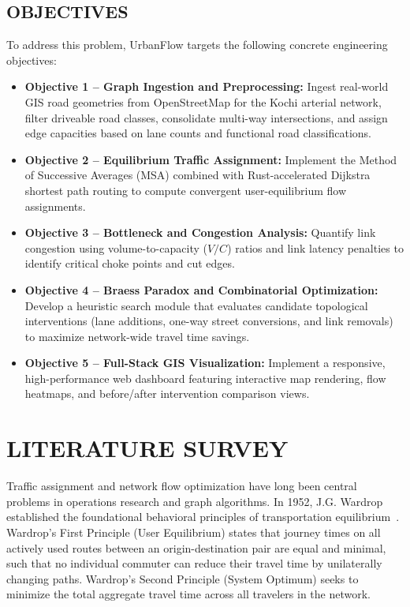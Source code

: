 \documentclass[12pt,a4paper]{report}
\begin{document}
\section{OBJECTIVES}
To address this problem, UrbanFlow targets the following concrete engineering objectives:
\begin{itemize}
  \item \textbf{Objective 1 -- Graph Ingestion and Preprocessing:} Ingest real-world GIS road geometries from OpenStreetMap for the Kochi arterial network, filter driveable road classes, consolidate multi-way intersections, and assign edge capacities based on lane counts and functional road classifications.
  \item \textbf{Objective 2 -- Equilibrium Traffic Assignment:} Implement the Method of Successive Averages (MSA) combined with Rust-accelerated Dijkstra shortest path routing to compute convergent user-equilibrium flow assignments.
  \item \textbf{Objective 3 -- Bottleneck and Congestion Analysis:} Quantify link congestion using volume-to-capacity ($V/C$) ratios and link latency penalties to identify critical choke points and cut edges.
  \item \textbf{Objective 4 -- Braess Paradox and Combinatorial Optimization:} Develop a heuristic search module that evaluates candidate topological interventions (lane additions, one-way street conversions, and link removals) to maximize network-wide travel time savings.
  \item \textbf{Objective 5 -- Full-Stack GIS Visualization:} Implement a responsive, high-performance web dashboard featuring interactive map rendering, flow heatmaps, and before/after intervention comparison views.
\end{itemize}

\chapter{LITERATURE SURVEY}
\label{chap:literature}
Traffic assignment and network flow optimization have long been central problems in operations research and graph algorithms. In 1952, J.G. Wardrop established the foundational behavioral principles of transportation equilibrium~\cite{wardrop1952}. Wardrop's First Principle (User Equilibrium) states that journey times on all actively used routes between an origin-destination pair are equal and minimal, such that no individual commuter can reduce their travel time by unilaterally changing paths. Wardrop's Second Principle (System Optimum) seeks to minimize the total aggregate travel time across all travelers in the network.
\end{document}
